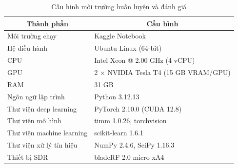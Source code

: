 \documentclass[../DoAn.tex]{subfiles}
\begin{document}
\begin{table}[H]
    \centering
    \caption{Cấu hình môi trường huấn luyện và đánh giá}
    \label{tab:training_environment}
    \renewcommand{\arraystretch}{1.3}
    \small
    \begin{tabular}{|p{}|p{}|}
        \hline
        \multicolumn{1}{|c|}{\textbf{Thành phần}} & \multicolumn{1}{c|}{\textbf{Cấu hình}} \\ \hline
        Môi trường chạy & Kaggle Notebook \\ \hline
        Hệ điều hành & Ubuntu Linux (64-bit) \\ \hline
        CPU & Intel Xeon @ 2.00 GHz (4 vCPU) \\ \hline
        GPU & 2 $\times$ NVIDIA Tesla T4 (15 GB VRAM/GPU) \\ \hline
        RAM & 31 GB \\ \hline
        Ngôn ngữ lập trình & Python 3.12.13 \\ \hline
        Thư viện deep learning & PyTorch 2.10.0 (CUDA 12.8) \\ \hline
        Thư viện mô hình & timm 1.0.26, torchvision \\ \hline
        Thư viện machine learning & scikit-learn 1.6.1 \\ \hline
        Thư viện xử lý tín hiệu & NumPy 2.4.6, SciPy 1.16.3 \\ \hline
        Thiết bị SDR & bladeRF 2.0 micro xA4 \\ \hline
    \end{tabular}
\end{table}
\end{document}
